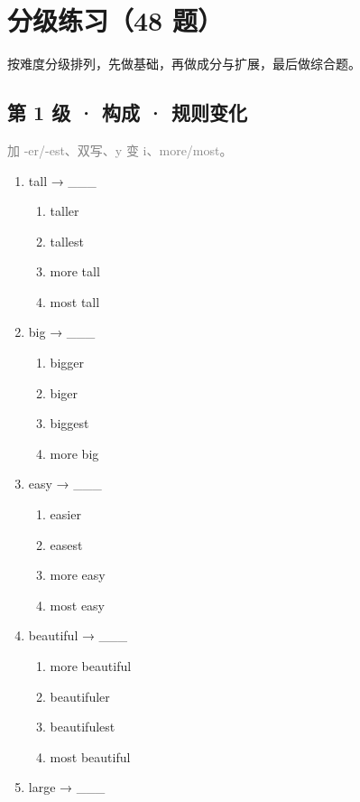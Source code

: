 \documentclass[11pt,a4paper]{ctexart}
\begin{document}
\newpage
\section{分级练习（48 题）}
\noindent 按难度分级排列，先做基础，再做成分与扩展，最后做综合题。

\subsection*{第 1 级 · 构成 · 规则变化}
\noindent\textcolor{gray}{加 -er/-est、双写、y 变 i、more/most。}\par\smallskip
\begin{enumerate}[leftmargin=*,itemsep=4pt]
\item tall → \_\_\_
\begin{enumerate}[label=\Alph*.,leftmargin=2em,itemsep=1pt,topsep=2pt]
\item taller
\item tallest
\item more tall
\item most tall
\end{enumerate}
\item big → \_\_\_
\begin{enumerate}[label=\Alph*.,leftmargin=2em,itemsep=1pt,topsep=2pt]
\item bigger
\item biger
\item biggest
\item more big
\end{enumerate}
\item easy → \_\_\_
\begin{enumerate}[label=\Alph*.,leftmargin=2em,itemsep=1pt,topsep=2pt]
\item easier
\item easest
\item more easy
\item most easy
\end{enumerate}
\item beautiful → \_\_\_
\begin{enumerate}[label=\Alph*.,leftmargin=2em,itemsep=1pt,topsep=2pt]
\item more beautiful
\item beautifuler
\item beautifulest
\item most beautiful
\end{enumerate}
\item large → \_\_\_
\begin{enumerate}[label=\Alph*.,leftmargin=2em,itemsep=1pt,topsep=2pt]

\end{enumerate}
\end{enumerate}
\end{document}
